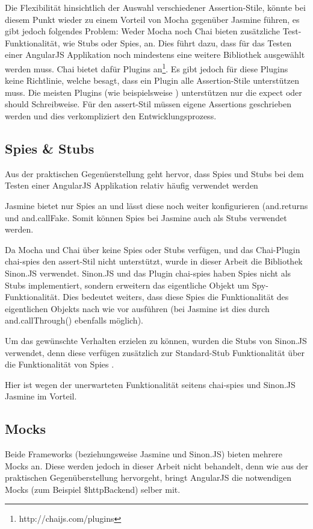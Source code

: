 Die Flexibilität hinsichtlich der Auswahl verschiedener Assertion-Stile, könnte bei diesem Punkt wieder zu einem Vorteil von Mocha gegenüber Jasmine führen, es gibt jedoch folgendes Problem: Weder Mocha noch Chai bieten zusätzliche Test-Funktionalität, wie Stubs oder Spies, an. Dies führt dazu, dass für das Testen einer AngularJS Applikation noch mindestens eine weitere Bibliothek ausgewählt werden muss. Chai bietet dafür Plugins an\footnote{http://chaijs.com/plugins}. Es gibt jedoch für diese Plugins keine Richtlinie, welche besagt, dass ein Plugin alle Assertion-Stile unterstützen muss. Die meisten Plugins (wie beispielsweise ) unterstützen nur die expect oder should Schreibweise. Für den assert-Stil müssen eigene Assertions geschrieben werden und dies verkompliziert den Entwicklungsprozess.

\subsection{Spies \& Stubs}
Aus der praktischen Gegenüerstellung geht hervor, dass Spies und Stubs bei dem Testen einer AngularJS Applikation relativ häufig verwendet werden
 
Jasmine bietet nur Spies an und lässt diese noch weiter konfigurieren (and.returns und and.callFake. Somit können Spies bei Jasmine auch als Stubs verwendet werden.

Da Mocha und Chai über keine Spies oder Stubs verfügen, und das Chai-Plugin chai-spies den assert-Stil nicht unterstützt, wurde in dieser Arbeit die Bibliothek Sinon.JS verwendet. Sinon.JS und das Plugin chai-spies haben Spies nicht als Stubs implementiert, sondern erweitern das eigentliche Objekt um Spy-Funktionalität. Dies bedeutet weiters, dass diese Spies die Funktionalität des eigentlichen Objekts nach wie vor ausführen (bei Jasmine ist dies durch and.callThrough() ebenfalls möglich).

Um das gewünschte Verhalten erzielen zu können, wurden die Stubs von Sinon.JS verwendet, denn diese verfügen zusätzlich zur Standard-Stub Funktionalität über die Funktionalität von Spies \autocite{Sinon:Documentation}.

Hier ist wegen der unerwarteten Funktionalität seitens chai-spies und Sinon.JS Jasmine im Vorteil.

\subsection{Mocks}
Beide Frameworks (beziehungsweise Jasmine und Sinon.JS) bieten mehrere Mocks an. Diese werden jedoch in dieser Arbeit nicht behandelt, denn wie aus der praktischen Gegenüberstellung hervorgeht, bringt AngularJS die notwendigen Mocks (zum Beispiel \$httpBackend) selber mit.

